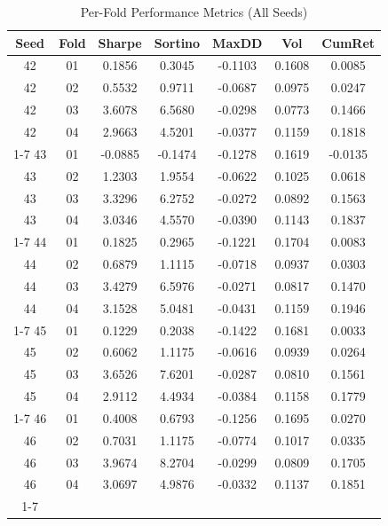 \begin{table}[t]
\centering
\caption{Per-Fold Performance Metrics (All Seeds)}
\label{tab:per_fold}
\begin{tabular}{ccccccc}
\toprule
Seed & Fold & Sharpe & Sortino & MaxDD & Vol & CumRet \\
\midrule
  42 & 01 & 0.1856 & 0.3045 & -0.1103 & 0.1608 & 0.0085 \\
  42 & 02 & 0.5532 & 0.9711 & -0.0687 & 0.0975 & 0.0247 \\
  42 & 03 & 3.6078 & 6.5680 & -0.0298 & 0.0773 & 0.1466 \\
  42 & 04 & 2.9663 & 4.5201 & -0.0377 & 0.1159 & 0.1818 \\
  \cmidrule{1-7}
  43 & 01 & -0.0885 & -0.1474 & -0.1278 & 0.1619 & -0.0135 \\
  43 & 02 & 1.2303 & 1.9554 & -0.0622 & 0.1025 & 0.0618 \\
  43 & 03 & 3.3296 & 6.2752 & -0.0272 & 0.0892 & 0.1563 \\
  43 & 04 & 3.0346 & 4.5570 & -0.0390 & 0.1143 & 0.1837 \\
  \cmidrule{1-7}
  44 & 01 & 0.1825 & 0.2965 & -0.1221 & 0.1704 & 0.0083 \\
  44 & 02 & 0.6879 & 1.1115 & -0.0718 & 0.0937 & 0.0303 \\
  44 & 03 & 3.4279 & 6.5976 & -0.0271 & 0.0817 & 0.1470 \\
  44 & 04 & 3.1528 & 5.0481 & -0.0431 & 0.1159 & 0.1946 \\
  \cmidrule{1-7}
  45 & 01 & 0.1229 & 0.2038 & -0.1422 & 0.1681 & 0.0033 \\
  45 & 02 & 0.6062 & 1.1175 & -0.0616 & 0.0939 & 0.0264 \\
  45 & 03 & 3.6526 & 7.6201 & -0.0287 & 0.0810 & 0.1561 \\
  45 & 04 & 2.9112 & 4.4934 & -0.0384 & 0.1158 & 0.1779 \\
  \cmidrule{1-7}
  46 & 01 & 0.4008 & 0.6793 & -0.1256 & 0.1695 & 0.0270 \\
  46 & 02 & 0.7031 & 1.1175 & -0.0774 & 0.1017 & 0.0335 \\
  46 & 03 & 3.9674 & 8.2704 & -0.0299 & 0.0809 & 0.1705 \\
  46 & 04 & 3.0697 & 4.9876 & -0.0332 & 0.1137 & 0.1851 \\
  \cmidrule{1-7}
\bottomrule
\end{tabular}
\end{table}